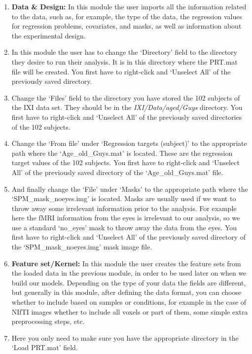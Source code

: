 \begin{enumerate}
\item \textbf{Data \& Design:} In this module the user imports all the information related to the data, such as, for example, the type of the data, the regression values for regression problems, covariates, and masks, as well as information about the experimental design.

\bi
\item In this module the user has to change the `Directory' field to the directory they desire to run their analysis. It is in this directory where the PRT.mat file will be created. You first have to right-click and `Unselect All' of the previously saved directory.
\item Change the `Files' field to the directory you have stored the 102 subjects of the IXI data set. They should be in the \textit{IXI/Data/aged/Guys} directory. You first have to right-click and `Unselect All' of the previously saved directories of the 102 subjects.
\item Change the `From file' under `Regression targets (subject)' to the appropriate path where the `Age\_old\_Guys.mat' is located. These are the regression target values of the 102 subjects. You first have to right-click and `Unselect All' of the previously saved directory of the `Age\_old\_Guys.mat' file.
\item And finally change the `File' under `Masks' to the appropriate path where the `SPM\_mask\_noeyes.img' is located. Masks are usually used if we want to throw away some irrelevant information prior to the analysis. For example here the fMRI information from the eyes is irrelevant to our analysis, so we use a standard `no\_eyes' mask to throw away the data from the eyes. You first have to right-click and `Unselect All' of the previously saved directory of the `SPM\_mask\_noeyes.img' mask image file.
\ei

\item \textbf{Feature set/Kernel:} In this module the user creates the feature sets from the loaded data in the previous module, in order to be used later on when we build our models. Depending on the type of your data the fields are different, but generally in this module, after defining the data format, you can choose whether to include based on samples or conditions, for example in the case of NIfTI images whether to include all voxels or part of them, some simple extra preprocessing steps, etc.

\bi
\item Here you only need to make sure you have the appropriate directory in the `Load PRT.mat' field.


\end{enumerate}
